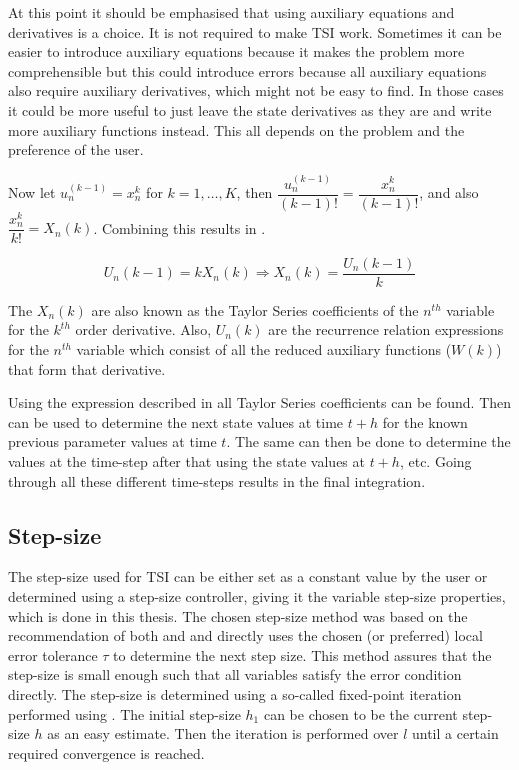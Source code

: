 At this point it should be emphasised that using auxiliary equations and derivatives is a choice. It is not required to make \ac{TSI} work. Sometimes it can be easier to introduce auxiliary equations because it makes the problem more comprehensible but this could introduce errors because all auxiliary equations also require auxiliary derivatives, which might not be easy to find. In those cases it could be more useful to just leave the state derivatives as they are and write more auxiliary functions instead. This all depends on the problem and the preference of the user. 


Now let $u_{n}^{\left(k-1\right)}=x_{n}^{k}$ for $k=1,\dots,K$, then $\dfrac{u_{n}^{\left(k-1\right)}}{\left(k-1\right)!}=\dfrac{x_{n}^{k}}{\left(k-1\right)!}$, and also $\dfrac{x_{n}^{k}}{k!}=X_{n}\left(k\right)$. Combining this results in .

\begin{equation} \label{eq:def_u}
U_{n}\left(k-1\right)=kX_{n}\left(k\right)\Rightarrow X_{n}\left(k\right)=\dfrac{U_{n}\left(k-1\right)}{k}
\end{equation}


The $X_{n}\left(k\right)$ are also known as the Taylor Series coefficients of the $n^{th}$ variable for the $k^{th}$ order derivative. Also, $U_{n}\left(k\right)$ are the recurrence relation expressions for the $n^{th}$ variable which consist of all the reduced auxiliary functions ($W\left(k\right)$) that form that derivative. 


Using the expression described in  all Taylor Series coefficients can be found. Then  can be used to determine the next state values at time $t+h$ for the known previous parameter values at time $t$. The same can then be done to determine the values at the time-step after that using the state values at $t+h$, etc. Going through all these different time-steps results in the final integration. 

\subsection{Step-size}
\label{subsec:stepSizeTsi}
The step-size used for \ac{TSI} can be either set as a constant value by the user or determined using a step-size controller, giving it the variable step-size properties, which is done in this thesis. The chosen step-size method was based on the recommendation of both \cite{scott2008high} and \cite{bergsma2015application} and directly uses the chosen (or preferred) local error tolerance $\tau$ to determine the next step size. This method assures that the step-size is small enough such that all variables satisfy the error condition directly. The step-size is determined using a so-called fixed-point iteration performed using . The initial step-size $h_{1}$ can be chosen to be the current step-size $h$ as an easy estimate. Then the iteration is performed over $l$ until a certain required convergence is reached.



